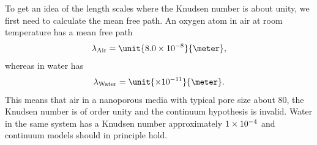 To get an idea of the length scales where the Knudsen number is about unity, we first need to calculate the mean free path. An oxygen atom in air at room temperature has a mean free path \cite{denny1993air}
\begin{align}
	\label{eq:air_mfp}
	\lambda_{\text{Air}} = \unit{8.0\e{-8}}{\meter},
\end{align}
whereas in water has
\begin{align}
	\label{eq:water_mfp}
	\lambda_{\text{Water}} = \unit{\e{-11}}{\meter}.
\end{align}
This means that air in a nanoporous media with typical pore size about \unit{80}{\nano\meter}, the Knudsen number is of order unity and the continuum hypothesis is invalid. Water in the same system has a Knudsen number approximately $1\times 10^{-4}$ and continuum models should in principle hold. 


